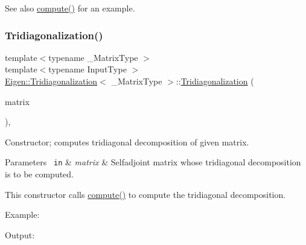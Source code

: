 \begin{DoxySeeAlso}{See also}
\mbox{\hyperlink{class_eigen_1_1_tridiagonalization_acd288abb081d3b40b87e4b98cd8f6ee9}{compute()}} for an example. 
\end{DoxySeeAlso}
\mbox{\label{class_eigen_1_1_tridiagonalization_a05406b7df9a92fdcba72d31443f67a98}} 
\subsubsection{\texorpdfstring{Tridiagonalization()}{Tridiagonalization()}\hspace{0.1cm}{\footnotesize\ttfamily [2/2]}}
{\footnotesize\ttfamily template$<$typename \+\_\+\+Matrix\+Type $>$ \\
template$<$typename Input\+Type $>$ \\
\mbox{\hyperlink{class_eigen_1_1_tridiagonalization}{Eigen\+::\+Tridiagonalization}}$<$ \+\_\+\+Matrix\+Type $>$\+::\mbox{\hyperlink{class_eigen_1_1_tridiagonalization}{Tridiagonalization}} (\begin{DoxyParamCaption}\item[{const \mbox{\hyperlink{struct_eigen_1_1_eigen_base}{Eigen\+Base}}$<$ Input\+Type $>$ \&}]{matrix }\end{DoxyParamCaption})\hspace{0.3cm}{\ttfamily [inline]}, {\ttfamily [explicit]}}



Constructor; computes tridiagonal decomposition of given matrix. 


\begin{DoxyParams}[1]{Parameters}
\mbox{\texttt{ in}}  & {\em matrix} & Selfadjoint matrix whose tridiagonal decomposition is to be computed.\\
\hline
\end{DoxyParams}
This constructor calls \mbox{\hyperlink{class_eigen_1_1_tridiagonalization_acd288abb081d3b40b87e4b98cd8f6ee9}{compute()}} to compute the tridiagonal decomposition.

Example\+: 
\begin{DoxyCodeInclude}{0}
\end{DoxyCodeInclude}
 Output\+: 
\begin{DoxyVerbInclude}
\end{DoxyVerbInclude}
 

